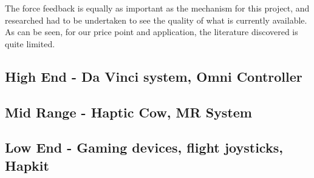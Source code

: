 The force feedback is equally as important as the mechanism for this project, and researched had to be undertaken to see the quality of what is currently available. As can be seen, for our price point and application, the literature discovered is quite limited.

\subsection{High End - Da Vinci system, Omni Controller} %
\label{sub:high_end_da_vinci_system}


\subsection{Mid Range - Haptic Cow, MR System} %
\label{sub:mid_range_haptic_cow_mr_system}



\subsection{Low End - Gaming devices, flight joysticks, Hapkit} %
\label{sub:low_end_gaming_devices_flight_joysticks_hapkit}




